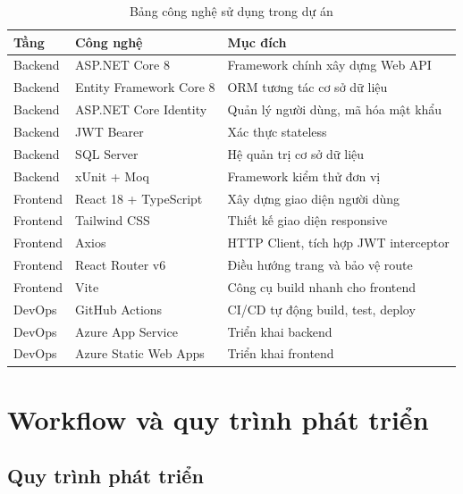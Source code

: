 \documentclass[a4paper]{article}
\begin{document}
\begin{table}[h!]
\centering
\caption{Bảng công nghệ sử dụng trong dự án}
\begin{tabularx}{\textwidth}{|l|l|X|}
\hline
\textbf{Tầng} & \textbf{Công nghệ} & \textbf{Mục đích} \\
\hline
Backend & ASP.NET Core 8 & Framework chính xây dựng Web API \\
\hline
Backend & Entity Framework Core 8 & ORM tương tác cơ sở dữ liệu \\
\hline
Backend & ASP.NET Core Identity & Quản lý người dùng, mã hóa mật khẩu \\
\hline
Backend & JWT Bearer & Xác thực stateless \\
\hline
Backend & SQL Server & Hệ quản trị cơ sở dữ liệu \\
\hline
Backend & xUnit + Moq & Framework kiểm thử đơn vị \\
\hline
Frontend & React 18 + TypeScript & Xây dựng giao diện người dùng \\
\hline
Frontend & Tailwind CSS & Thiết kế giao diện responsive \\
\hline
Frontend & Axios & HTTP Client, tích hợp JWT interceptor \\
\hline
Frontend & React Router v6 & Điều hướng trang và bảo vệ route \\
\hline
Frontend & Vite & Công cụ build nhanh cho frontend \\
\hline
DevOps & GitHub Actions & CI/CD tự động build, test, deploy \\
\hline
DevOps & Azure App Service & Triển khai backend \\
\hline
DevOps & Azure Static Web Apps & Triển khai frontend \\
\hline
\end{tabularx}
\end{table}

\newpage

\section{Workflow và quy trình phát triển}

\subsection{Quy trình phát triển}
\end{document}
